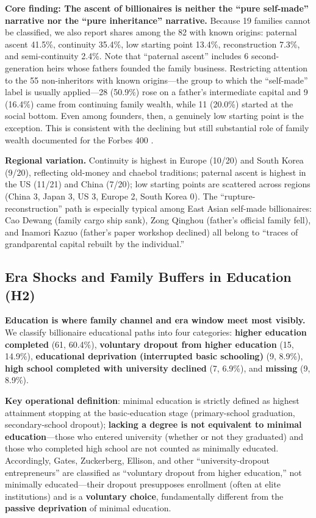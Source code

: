 \documentclass[11pt,a4paper]{article}
\begin{document}
\textbf{Core finding: The ascent of billionaires is neither the ``pure self-made'' narrative nor the ``pure inheritance'' narrative.} Because 19 families cannot be classified, we also report shares among the 82 with known origins: paternal ascent 41.5\%, continuity 35.4\%, low starting point 13.4\%, reconstruction 7.3\%, and semi-continuity 2.4\%. Note that ``paternal ascent'' includes 6 second-generation heirs whose fathers founded the family business. Restricting attention to the 55 non-inheritors with known origins---the group to which the ``self-made'' label is usually applied---28 (50.9\%) rose on a father's intermediate capital and 9 (16.4\%) came from continuing family wealth, while 11 (20.0\%) started at the social bottom. Even among founders, then, a genuinely low starting point is the exception. This is consistent with the declining but still substantial role of family wealth documented for the Forbes 400 \citep{kaplan2013,korom2017}.

\textbf{Regional variation.} Continuity is highest in Europe (10/20) and South Korea (9/20), reflecting old-money and chaebol traditions; paternal ascent is highest in the US (11/21) and China (7/20); low starting points are scattered across regions (China 3, Japan 3, US 3, Europe 2, South Korea 0). The ``rupture-reconstruction'' path is especially typical among East Asian self-made billionaires: Cao Dewang (family cargo ship sank), Zong Qinghou (father's official family fell), and Inamori Kazuo (father's paper workshop declined) all belong to ``traces of grandparental capital rebuilt by the individual.''

\subsection{Era Shocks and Family Buffers in Education (H2)}

\textbf{Education is where family channel and era window meet most visibly.} We classify billionaire educational paths into four categories: \textbf{higher education completed} (61, 60.4\%), \textbf{voluntary dropout from higher education} (15, 14.9\%), \textbf{educational deprivation (interrupted basic schooling)} (9, 8.9\%), \textbf{high school completed with university declined} (7, 6.9\%), and \textbf{missing} (9, 8.9\%).

\textbf{Key operational definition}: minimal education is strictly defined as highest attainment stopping at the basic-education stage (primary-school graduation, secondary-school dropout); \textbf{lacking a degree is not equivalent to minimal education}---those who entered university (whether or not they graduated) and those who completed high school are not counted as minimally educated. Accordingly, Gates, Zuckerberg, Ellison, and other ``university-dropout entrepreneurs'' are classified as ``voluntary dropout from higher education,'' not minimally educated---their dropout presupposes enrollment (often at elite institutions) and is a \textbf{voluntary choice}, fundamentally different from the \textbf{passive deprivation} of minimal education.
\end{document}
